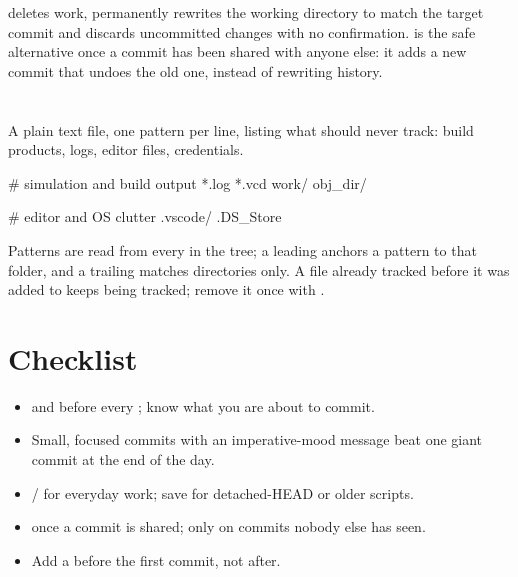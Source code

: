 \begin{gotcha}{ deletes work, permanently}
 rewrites the working directory to match the
target commit and discards uncommitted changes with no confirmation.
 is the safe alternative once a commit has been shared
with anyone else: it adds a new commit that undoes the old one, instead
of rewriting history.
\end{gotcha}

\section{}
\label{sec:commands:gitignore}

A plain text file, one pattern per line, listing what \Git{} should
never track: build products, logs, editor files, credentials.

\begin{txtcode}
# simulation and build output
*.log
*.vcd
work/
obj_dir/

# editor and OS clutter
.vscode/
.DS_Store
\end{txtcode}

Patterns are read from every  in the tree; a leading
\code{/} anchors a pattern to that folder, and a trailing \code{/}
matches directories only. A file already tracked before it was added to
 keeps being tracked; remove it once with
.

\section{Checklist}
\label{sec:commands:checklist}

\begin{itemize}
  \item {} and  before every ; know
        what you are about to commit.
  \item Small, focused commits with an imperative-mood message beat one
        giant commit at the end of the day.
  \item {}/ for everyday work; save
         for detached-HEAD or older scripts.
  \item {} once a commit is shared;  only
        on commits nobody else has seen.
  \item Add a  before the first commit, not after.
\end{itemize}

